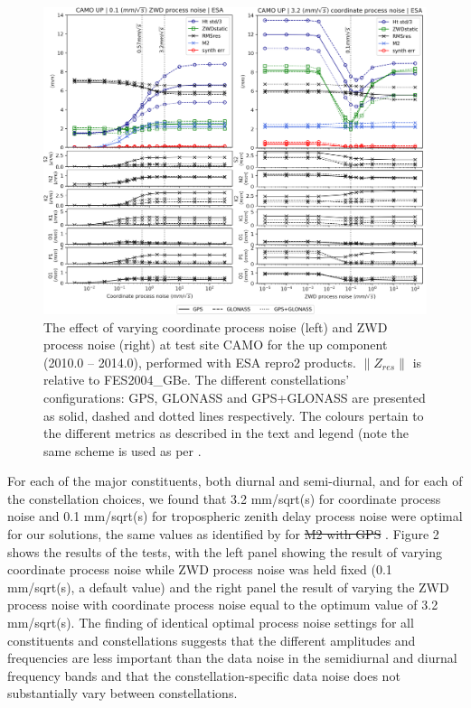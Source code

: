 \documentclass[se, manuscript]{copernicus}
\providecommand{\DIFadd}[1]{{\protect\color{blue}\uwave{#1}}} %
\providecommand{\DIFdel}[1]{{\protect\color{red}\sout{#1}}}                      %
\providecommand{\DIFaddbegin}{} %
\providecommand{\DIFaddend}{} %
\providecommand{\DIFdelbegin}{} %
\providecommand{\DIFdelend}{} %
\begin{document}
\begin{figure}[t]
\includegraphics[width=17cm]{fig02.png}
\caption{The effect of varying coordinate process noise (left) and ZWD process noise (right) at test site CAMO for the up component (2010.0 – 2014.0), performed with ESA repro2 products. $\|Z_{res}\|$ is relative to FES2004\_GBe. The different constellations’ configurations: GPS, GLONASS and GPS+GLONASS are presented as solid, dashed and dotted lines respectively. The colours pertain to the different metrics as described in the text and legend (note the same scheme is used as per \cite{Penna2015}. }
\end{figure}

For each of the major constituents, both diurnal and semi-diurnal, and for each of the constellation choices, we found that 3.2 mm/sqrt(s) for coordinate process noise and 0.1 mm/sqrt(s) for tropospheric zenith delay process noise were optimal for our solutions, the same values as identified by \cite{Penna2015} for \DIFdelbegin \DIFdel{M2 with GPS }\DIFdelend \DIFaddbegin \DIFadd{$M_2$ using GPS only}\DIFaddend . Figure 2 shows the results of the tests, with the left panel showing the result of varying coordinate process noise while ZWD process noise was held fixed (0.1 mm/sqrt(s), a default value) and the right panel the result of varying the ZWD process noise with coordinate process noise equal to the optimum value of 3.2 mm/sqrt(s). The finding of identical optimal process noise settings for all constituents and constellations suggests that the different amplitudes and frequencies are less important than the data noise in the semidiurnal and diurnal frequency bands and that the constellation-specific data noise does not substantially vary between constellations. 
\end{document}
